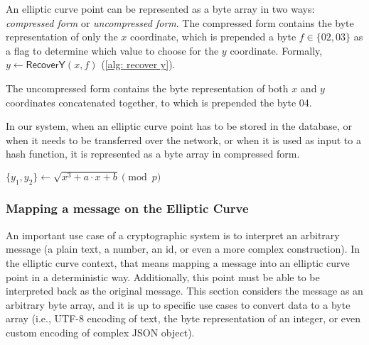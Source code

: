 An elliptic curve point can be represented as a byte array in two ways: \textit{compressed form} or \textit{uncompressed form}. The compressed form contains the byte representation of only the $x$ coordinate, which is prepended a byte $f \in \{ 02, 03 \}$ as a flag to determine which value to choose for the $y$ coordinate. Formally, $y \gets \mathsf{RecoverY}(x, f)$ (\cref{alg: recover y}).

The uncompressed form contains the byte representation of both $x$ and $y$ coordinates concatenated together, to which is prepended the byte 04.

In our system, when an elliptic curve point has to be stored in the database, or when it needs to be transferred over the network, or when it is used as input to a hash function, it is represented as a byte array in compressed form.

\begin{algorithm}[ht]
\DontPrintSemicolon
    \caption{$\mathsf{RecoverY} (x, f)$}
    \label{alg: recover y}

    $\{ y_1, y_2 \} \gets \sqrt{x^3 + a \cdot x + b} \pmod p$ \;
     
\end{algorithm}


\subsubsection{Mapping a message on the Elliptic Curve} \label{app: mapping a message on the elliptic curve}
An important use case of a cryptographic system is to interpret an arbitrary message (a plain text, a number, an id, or even a more complex construction). In the elliptic curve context, that means mapping a message into an elliptic curve point in a deterministic way. Additionally, this point must be able to be interpreted back as the original message. This section considers the message as an arbitrary byte array, and it is up to specific use cases to convert data to a byte array (i.e., UTF-8 encoding of text, the byte representation of an integer, or even custom encoding of complex JSON object).

